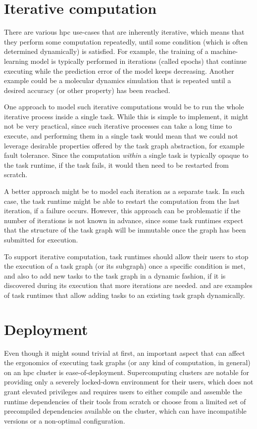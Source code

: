 \section{Iterative computation}
There are various \gls{hpc} use-cases that are inherently iterative, which means
that they perform some computation repeatedly, until some condition (which is often determined
dynamically) is satisfied. For example, the training of a machine-learning model is typically
performed in iterations (called epochs) that continue executing while the prediction error of the
model keeps decreasing. Another example could be a molecular dynamics simulation that is repeated
until a desired accuracy (or other property) has been reached.

One approach to model such iterative computations would be to run the whole iterative process
inside a single task. While this is simple to implement, it might not be very practical, since such
iterative processes can take a long time to execute, and performing them in a single task would
mean that we could not leverage desirable properties offered by the task graph abstraction, for
example fault tolerance. Since the computation \emph{within} a single task is
typically opaque to the task runtime, if the task fails, it would then need to be restarted from
scratch.

A better approach might be to model each iteration as a separate task. In such case, the task
runtime might be able to restart the computation from the last iteration, if a failure occurs.
However, this approach can be problematic if the number of iterations is not known in advance,
since some task runtimes expect that the structure of the task graph will be immutable once the
graph has been submitted for execution.

To support iterative computation, task runtimes should allow their users to stop the execution of a
task graph (or its subgraph) once a specific condition is met, and also to add new tasks to the
task graph in a dynamic fashion, if it is discovered during its execution that more iterations are
needed. \dask{} and \ray{} are examples of task runtimes
that allow adding tasks to an existing task graph dynamically.

\section{Deployment}
\label{challenge:deployment}
Even though it might sound trivial at first, an important aspect that can affect the ergonomics of
executing task graphs (or any kind of computation, in general) on an \gls{hpc}
cluster is ease-of-deployment. Supercomputing clusters are notable for providing only a severely
locked-down environment for their users, which does not grant elevated privileges and requires
users to either compile and assemble the runtime dependencies of their tools from scratch or choose
from a limited set of precompiled dependencies available on the cluster, which can have
incompatible versions or a non-optimal configuration.

